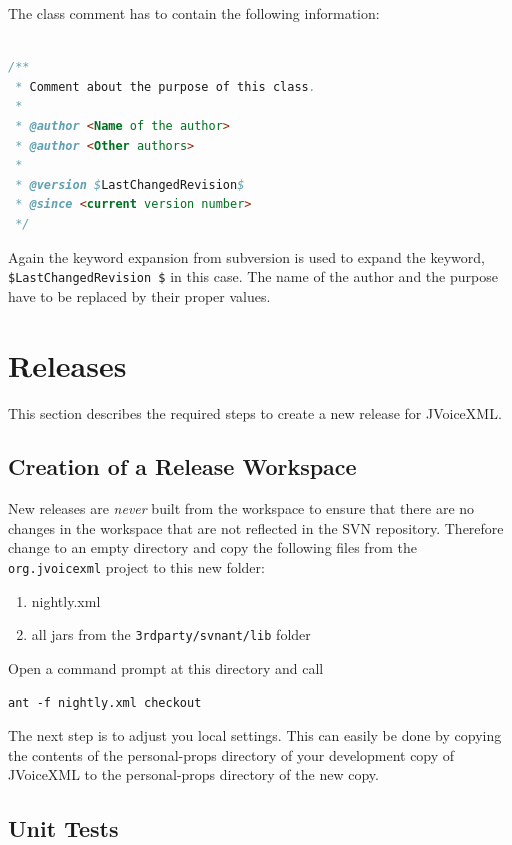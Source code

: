 \documentclass[11pt,a4paper]{article}
\begin{document}
The class comment has to contain the following information:

\begin{lstlisting}[language=Java]

/**
 * Comment about the purpose of this class.
 *
 * @author <Name of the author>
 * @author <Other authors>
 *
 * @version $LastChangedRevision$
 * @since <current version number>
 */
\end{lstlisting}

Again the keyword expansion from subversion is used to expand the keyword,
\texttt{\$LastChangedRevision \$} in this case. The name of the author and the 
purpose have to be replaced by their proper values.

\section{Releases}

This section describes the required steps to create a new release for
JVoice\-XML.

\subsection{Creation of a Release Workspace}

New releases are \emph{never} built from the workspace to ensure that there are
no changes in the workspace that are not reflected in the SVN repository.
Therefore change to an empty directory and copy the following files from the
\texttt{org.jvoicexml} project to this new folder:
\begin{enumerate}
  \item nightly.xml
  \item all jars from the \texttt{3rdparty/svnant/lib} folder
\end{enumerate}
Open a command prompt at this directory and call
\begin{lstlisting}
ant -f nightly.xml checkout
\end{lstlisting}

The next step is to adjust you local settings. This can easily be done by
copying the contents of the personal-props directory of your development copy
of JVoiceXML to the personal-props directory of the new copy.


\subsection{Unit Tests}
\end{document}
